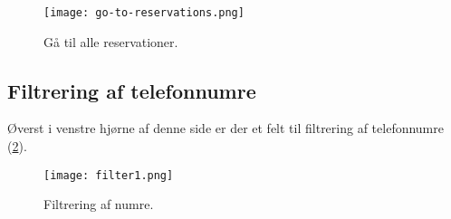 \begin{figure} [h]
  \centering
  \texttt{[image: go-to-reservations.png]}
  \caption{Gå til alle reservationer.}
  \label{screenshot: go-to-reservations1}
\end{figure}

\subsection{Filtrering af telefonnumre}

Øverst i venstre hjørne af denne side er der et felt til filtrering af telefonnumre (\ref{screenshot: filter1}).

\begin{figure} [h]
  \centering
  \texttt{[image: filter1.png]}
  \caption{Filtrering af numre.}
  \label{screenshot: filter1}
\end{figure}

